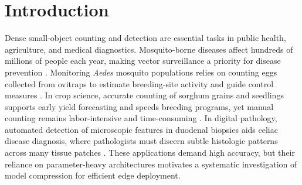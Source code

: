 %
%
%                 

\chapter{Introduction}
\label{sec:intro}    %

Dense small-object counting and detection are essential tasks in public health, agriculture, and medical diagnostics. Mosquito-borne diseases affect hundreds of millions of people each year, making vector surveillance a priority for disease prevention \cite{Javed2023}. Monitoring \textit{Aedes} mosquito populations relies on counting eggs collected from ovitraps to estimate breeding-site activity and guide control measures \cite{NaranjoAlcazar2024}. In crop science, accurate counting of sorghum grains and seedlings supports early yield forecasting and speeds breeding programs, yet manual counting remains labor-intensive and time-consuming \cite{Chen2024,Santiago2024}. In digital pathology, automated detection of microscopic features in duodenal biopsies aids celiac disease diagnosis, where pathologists must discern subtle histologic patterns across many tissue patches \cite{Sali2019,Stoleru2022}. These applications demand high accuracy, but their reliance on parameter-heavy architectures motivates a systematic investigation of model compression for efficient edge deployment.

